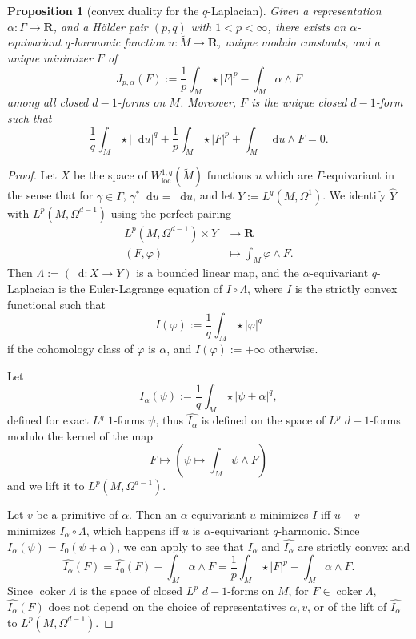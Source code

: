 \documentclass[reqno,11pt]{amsart}
\newcommand{\RR}{\mathbf{R}}
\newcommand*\dif{\mathop{}\!\mathrm{d}}
\DeclareMathOperator{\coker}{coker}
\newcommand{\loc}{\mathrm{loc}}
\newtheorem{proposition}[theorem]{Proposition}
\theoremstyle{definition}
\numberwithin{equation}{section}
\begin{document}
\begin{proposition}[convex duality for the $q$-Laplacian]\label{mfmc qLaplacian}
Given a representation $\alpha: \Gamma \to \RR$, and a H\"older pair $(p, q)$ with $1 < p < \infty$, there exists an $\alpha$-equivariant $q$-harmonic function $u: \tilde M \to \RR$, unique modulo constants, and a unique minimizer $F$ of 
$$J_{p, \alpha}(F) := \frac{1}{p} \int_M \star |F|^p - \int_M \alpha \wedge F$$
among all closed $d - 1$-forms on $M$.
Moreover, $F$ is the unique closed $d - 1$-form such that
\begin{equation}\label{strong duality}
	\frac{1}{q} \int_M \star |\dif u|^q + \frac{1}{p} \int_M \star |F|^p + \int_M \dif u \wedge F = 0.
\end{equation}
\end{proposition}
\begin{proof}
Let $X$ be the space of $W^{1, q}_\loc(\tilde M)$ functions $u$ which are $\Gamma$-equivariant in the sense that for $\gamma \in \Gamma$, $\gamma^* \dif u = \dif u$, and let $Y := L^q(M, \Omega^1)$.
We identify $\hat Y$ with $L^p(M, \Omega^{d - 1})$ using the perfect pairing 
\begin{align*}
	L^p(M, \Omega^{d - 1}) \times Y &\to \RR \\
	(F, \varphi) &\mapsto \int_M \varphi \wedge F.
\end{align*}
Then $\Lambda := (\dif: X \to Y)$ is a bounded linear map, and the $\alpha$-equivariant $q$-Laplacian is the Euler-Lagrange equation of $I \circ \Lambda$, where $I$ is the strictly convex functional such that
$$I(\varphi) := \frac{1}{q} \int_M \star |\varphi|^q$$
if the cohomology class of $\varphi$ is $\alpha$, and $I(\varphi) := +\infty$ otherwise.

Let
$$I_\alpha(\psi) := \frac{1}{q} \int_M \star |\psi + \alpha|^q,$$
defined for exact $L^q$ $1$-forms $\psi$, thus $\widehat{I_\alpha}$ is defined on the space of $L^p$ $d - 1$-forms modulo the kernel of the map
$$F \mapsto \left(\psi \mapsto \int_M \psi \wedge F\right)$$
and we lift it to $L^p(M, \Omega^{d - 1})$.

Let $v$ be a primitive of $\alpha$.
Then an $\alpha$-equivariant $u$ minimizes $I$ iff $u - v$ minimizes $I_\alpha \circ \Lambda$, which happens iff $u$ is $\alpha$-equivariant $q$-harmonic.
Since $I_\alpha(\psi) = I_0(\psi + \alpha)$, we can apply \cite[Chapter I, Remark 4.1]{Ekeland99} to see that $I_\alpha$ and $\widehat{I_\alpha}$ are strictly convex and
$$\widehat{I_\alpha}(F) = \widehat{I_0}(F) - \int_M \alpha \wedge F = \frac{1}{p} \int_M \star |F|^p - \int_M \alpha \wedge F.$$
Since $\coker \Lambda$ is the space of closed $L^p$ $d - 1$-forms on $M$, for $F \in \coker \Lambda$, $\widehat{I_\alpha}(F)$ does not depend on the choice of representatives $\alpha, v$, or of the lift of $\widehat{I_\alpha}$ to $L^p(M, \Omega^{d - 1})$.


\end{proof}
\end{document}
